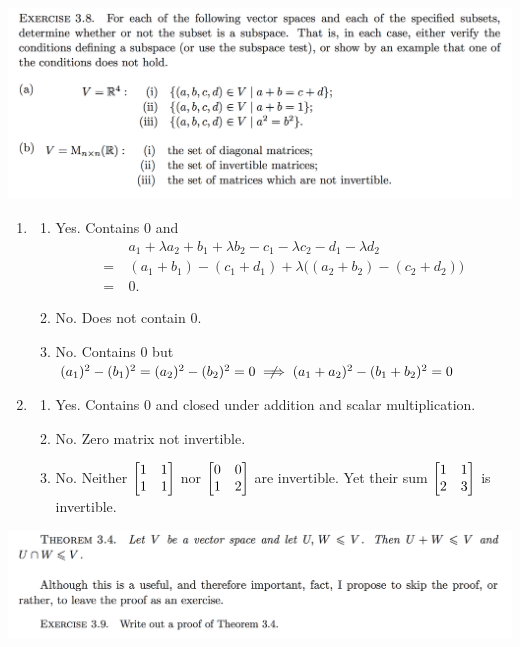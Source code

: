 \documentclass[12pt]{article}
\begin{document}
\begin{mdframed}
\includegraphics[width=400pt]{img/oxford-prelims-M1-linear-algebra-3-8.png}
\end{mdframed}

\begin{enumerate}[label=(\alph*)]
\item
  \begin{enumerate}[label=(\roman*)]
  \item Yes. Contains $0$ and
    \begin{align*}
      &a_1 + \lambda a_2 + b_1 + \lambda b_2 - c_1 - \lambda c_2 - d_1 - \lambda d_2\\
      =~&(a_1 + b_1) - (c_1 + d_1) + \lambda\Big((a_2 + b_2) - (c_2 + d_2)\Big)\\
      =~&0.
    \end{align*}
  \item No. Does not contain 0.
  \item No. Contains 0 but $(a_1)^2 - (b_1)^2 = (a_2)^2 - (b_2)^2 = 0 \nimplies (a_1 + a_2)^2 - (b_1 + b_2)^2 = 0$
  \end{enumerate}
\item
  \begin{enumerate}[label=(\roman*)]
  \item Yes. Contains 0 and closed under addition and scalar multiplication.
  \item No. Zero matrix not invertible.
  \item No. Neither $\begin{bmatrix}1 & 1\\1 & 1\\ \end{bmatrix}$ nor $\begin{bmatrix}0 & 0\\1 & 2\\ \end{bmatrix}$ are invertible.
        Yet their sum $\begin{bmatrix}1 & 1\\2 & 3\\ \end{bmatrix}$ is invertible.
  \end{enumerate}
\end{enumerate}

\begin{mdframed}
\includegraphics[width=400pt]{img/oxford-prelims-M1-linear-algebra-3-9.png}
\end{mdframed}
\end{document}
